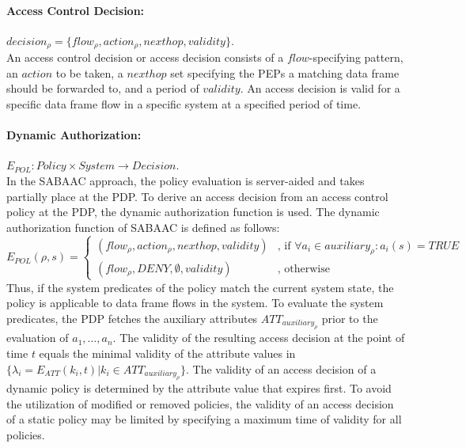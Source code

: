 \paragraph{Access Control Decision:} $decision_{\rho} = \{flow_\rho, action_\rho, nexthop, validity\}$.\\
An access control decision or access decision consists of a $flow$-specifying pattern, an $action$ to be taken, a $nexthop$ set specifying the PEPs a matching data frame should be forwarded to, and a period of $validity$.
An access decision is valid for a specific data frame flow in a specific system at a specified period of time.

\paragraph{Dynamic Authorization:} $E_{POL}: Policy \times System \rightarrow Decision$.\\
In the SABAAC approach, the policy evaluation is server-aided and takes partially place at the PDP.
To derive an access decision from an access control policy at the PDP, the dynamic authorization function is used.
The dynamic authorization function of SABAAC is defined as follows:
\[
    E_{POL}(\rho, s) =
    \begin{cases}
        (flow_\rho, action_\rho, nexthop, validity) & \text{, if } \forall a_i \in auxiliary_{\rho}: a_i(s) = TRUE\\
        (flow_\rho, DENY, \emptyset, validity) & \text{, otherwise}
    \end{cases}
\]
Thus, if the system predicates of the policy match the current system state, the policy is applicable to data frame flows in the system.
To evaluate the system predicates, the PDP fetches the auxiliary attributes $ATT_{auxiliary_{\rho}}$ prior to the evaluation of $a_1, \dots, a_n$.
The validity of the resulting access decision at the point of time $t$ equals the minimal validity of the attribute values in $\{\lambda_i = E_{ATT}(k_i, t) | k_i \in ATT_{auxiliary_{\rho}}\}$.
The validity of an access decision of a dynamic policy is determined by the attribute value that expires first.
To avoid the utilization of modified or removed policies, the validity of an access decision of a static policy may be limited by specifying a maximum time of validity for all policies.


